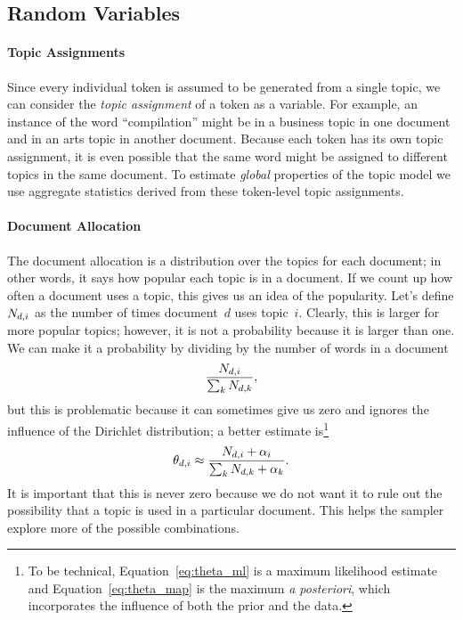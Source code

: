 \subsection{Random Variables}

\paragraph{Topic Assignments}

Since every individual token is assumed to be generated from a single topic,
we can consider the {\em topic assignment} of a token as a variable.  For example,
an instance of the word ``compilation'' might be in a business topic in one
document and in an arts topic in another document.  Because each token has its own
topic assignment, it is even possible that the
same word might be assigned to different topics in the same document.
To estimate \emph{global} properties of the topic model we use aggregate statistics derived from these token-level topic assignments.

\paragraph{Document Allocation} The document allocation is a distribution over
the topics for each document; in other words, it says how popular each topic is
in a document.  If we count up how often a document uses a topic, this gives us
an idea of the popularity.  Let's define $N_{d,i}$ as the number of times
document~$d$ uses topic~$i$.  Clearly, this is larger for more popular topics;
however, it is not a probability because it is larger than one.  We can make it a
probability by dividing by the number of words in a document
\begin{equation}
\frac{N_{d,i}}{\sum_k N_{d,k}},
\label{eq:theta_ml}
\end{equation}
but this is problematic because it can sometimes give us zero and ignores the
influence of the Dirichlet distribution; a better estimate is\footnote{To be
  technical, Equation~\ref{eq:theta_ml} is a maximum likelihood estimate and
  Equation~\ref{eq:theta_map} is the maximum \textit{a posteriori}, which
  incorporates the influence of both the prior and the data.}
\begin{equation}
\theta_{d,i} \approx \frac{N_{d,i} + \alpha_i}{\sum_k N_{d,k} + \alpha_k}.
\label{eq:theta_map}
\end{equation}
It is important that this is never zero because we do not want it to rule out the possibility
that a topic is used in a particular document.  This helps the sampler
explore more of the possible combinations.

